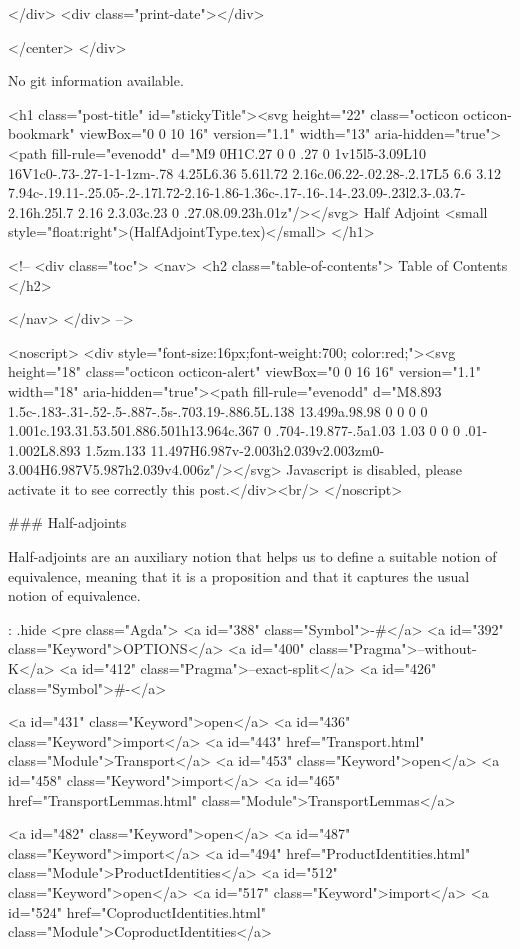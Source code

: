           
        </div>
        <div class="print-date"></div>
        
        
    </center>
  </div>

  
  No git information available.
  

  <h1 class="post-title" id="stickyTitle"><svg height="22" class="octicon octicon-bookmark" viewBox="0 0 10 16" version="1.1" width="13" aria-hidden="true"><path fill-rule="evenodd" d="M9 0H1C.27 0 0 .27 0 1v15l5-3.09L10 16V1c0-.73-.27-1-1-1zm-.78 4.25L6.36 5.61l.72 2.16c.06.22-.02.28-.2.17L5 6.6 3.12 7.94c-.19.11-.25.05-.2-.17l.72-2.16-1.86-1.36c-.17-.16-.14-.23.09-.23l2.3-.03.7-2.16h.25l.7 2.16 2.3.03c.23 0 .27.08.09.23h.01z"/></svg> Half Adjoint <small style="float:right">(HalfAdjointType.tex)</small>
  </h1>

  <!-- 
  <div class="toc">
    <nav>
    <h2 class="table-of-contents"> Table of Contents </h2>
      

    </nav>
  </div>
   -->

  <noscript>
  <div style="font-size:16px;font-weight:700; color:red;"><svg height="18" class="octicon octicon-alert" viewBox="0 0 16 16" version="1.1" width="18" aria-hidden="true"><path fill-rule="evenodd" d="M8.893 1.5c-.183-.31-.52-.5-.887-.5s-.703.19-.886.5L.138 13.499a.98.98 0 0 0 0 1.001c.193.31.53.501.886.501h13.964c.367 0 .704-.19.877-.5a1.03 1.03 0 0 0 .01-1.002L8.893 1.5zm.133 11.497H6.987v-2.003h2.039v2.003zm0-3.004H6.987V5.987h2.039v4.006z"/></svg> Javascript is disabled, please activate it to see correctly this post.</div><br/>
  </noscript>

  ### Half-adjoints

Half-adjoints are an auxiliary notion that helps us to define a suitable notion
of equivalence, meaning that it is a proposition and that it captures the usual
notion of equivalence.

{: .hide}
<pre class="Agda">
<a id="388" class="Symbol">{-#</a> <a id="392" class="Keyword">OPTIONS</a> <a id="400" class="Pragma">--without-K</a> <a id="412" class="Pragma">--exact-split</a> <a id="426" class="Symbol">#-}</a>

<a id="431" class="Keyword">open</a> <a id="436" class="Keyword">import</a> <a id="443" href="Transport.html" class="Module">Transport</a>
<a id="453" class="Keyword">open</a> <a id="458" class="Keyword">import</a> <a id="465" href="TransportLemmas.html" class="Module">TransportLemmas</a>

<a id="482" class="Keyword">open</a> <a id="487" class="Keyword">import</a> <a id="494" href="ProductIdentities.html" class="Module">ProductIdentities</a>
<a id="512" class="Keyword">open</a> <a id="517" class="Keyword">import</a> <a id="524" href="CoproductIdentities.html" class="Module">CoproductIdentities</a>

